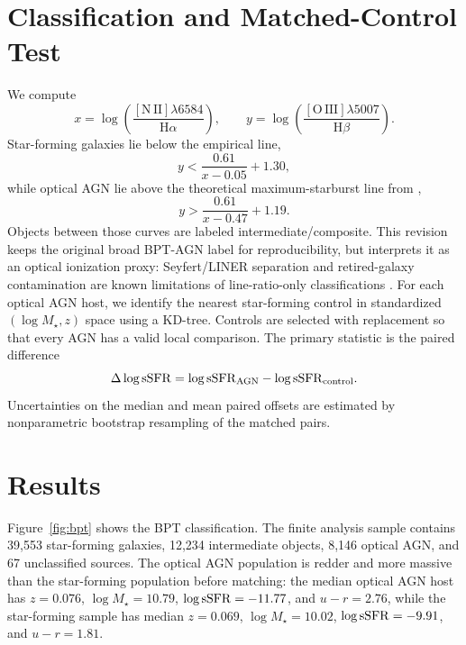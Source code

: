 \documentclass[twocolumn]{aastex631}
\begin{document}
\section{Classification and Matched-Control Test}\label{sec:methods}
We compute
\begin{equation}
 x = \log\left(\frac{[\mathrm{N\,II}]\lambda6584}{\mathrm{H}\alpha}\right), \qquad
 y = \log\left(\frac{[\mathrm{O\,III}]\lambda5007}{\mathrm{H}\beta}\right).
\end{equation}
Star-forming galaxies lie below the empirical \citet{kauffmann2003} line,
\begin{equation}
 y < \frac{0.61}{x-0.05} + 1.30,
\end{equation}
while optical AGN lie above the theoretical maximum-starburst line from \citet{kewley2001},
\begin{equation}
 y > \frac{0.61}{x-0.47} + 1.19.
\end{equation}
Objects between those curves are labeled intermediate/composite.  This revision keeps the original broad BPT-AGN label for reproducibility, but interprets it as an optical ionization proxy: Seyfert/LINER separation and retired-galaxy contamination are known limitations of line-ratio-only classifications \citep{kewley2006,stasinska2015}.  For each optical AGN host, we identify the nearest star-forming control in standardized $(\log M_\star,z)$ space using a KD-tree.  Controls are selected with replacement so that every AGN has a valid local comparison.  The primary statistic is the paired difference
\begin{equation}
 \Delta\log{\rm sSFR} = \log{\rm sSFR}_{\rm AGN} - \log{\rm sSFR}_{\rm control}.
\end{equation}
Uncertainties on the median and mean paired offsets are estimated by nonparametric bootstrap resampling of the matched pairs.

\section{Results}\label{sec:results}
Figure~\ref{fig:bpt} shows the BPT classification.  The finite analysis sample contains 39,553 star-forming galaxies, 12,234 intermediate objects, 8,146 optical AGN, and 67 unclassified sources.  The optical AGN population is redder and more massive than the star-forming population before matching: the median optical AGN host has $z=0.076$, $\log M_\star=10.79$, $\log{\rm sSFR}=-11.77$, and $u-r=2.76$, while the star-forming sample has median $z=0.069$, $\log M_\star=10.02$, $\log{\rm sSFR}=-9.91$, and $u-r=1.81$.
\end{document}
